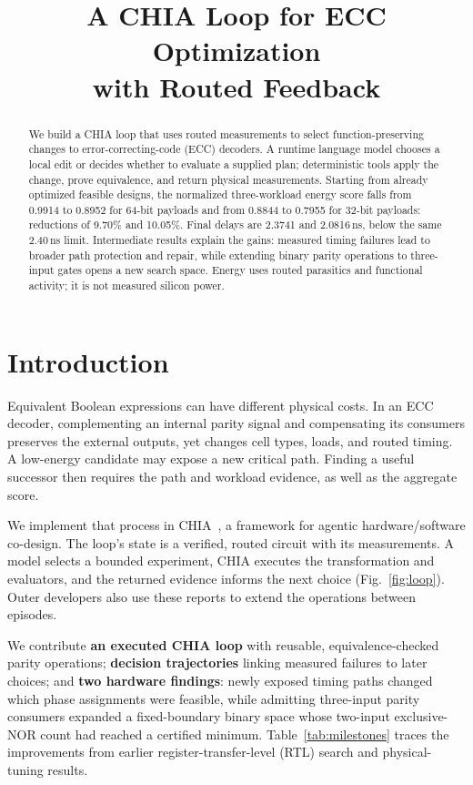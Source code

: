 \documentclass[conference,10pt]{IEEEtran}
\title{A CHIA Loop for ECC Optimization\\with Routed Feedback}
\author{\IEEEauthorblockN{Ssu-Rui Lee}\IEEEauthorblockA{RaydioTek, Taiwan\\\texttt{ssr.lee@raydiotek.tw}}}
\begin{document}
\maketitle
\raggedbottom
{}
\begin{abstract}
We build a CHIA loop that uses routed measurements to select function-preserving changes to error-correcting-code (ECC) decoders. A runtime language model chooses a local edit or decides whether to evaluate a supplied plan; deterministic tools apply the change, prove equivalence, and return physical measurements. Starting from already optimized feasible designs, the normalized three-workload energy score falls from 0.9914 to 0.8952 for 64-bit payloads and from 0.8844 to 0.7955 for 32-bit payloads: reductions of 9.70\% and 10.05\%. Final delays are 2.3741 and 2.0816\,ns, below the same 2.40\,ns limit. Intermediate results explain the gains: measured timing failures lead to broader path protection and repair, while extending binary parity operations to three-input gates opens a new search space. Energy uses routed parasitics and functional activity; it is not measured silicon power.
\end{abstract}

\section{Introduction}

Equivalent Boolean expressions can have different physical costs. In an ECC decoder, complementing an internal parity signal and compensating its consumers preserves the external outputs, yet changes cell types, loads, and routed timing. A low-energy candidate may expose a new critical path. Finding a useful successor then requires the path and workload evidence, as well as the aggregate score.

We implement that process in CHIA~\cite{chia}, a framework for agentic hardware/software co-design. The loop's state is a verified, routed circuit with its measurements. A model selects a bounded experiment, CHIA executes the transformation and evaluators, and the returned evidence informs the next choice (Fig.~\ref{fig:loop}). Outer developers also use these reports to extend the operations between episodes.

We contribute \textbf{an executed CHIA loop} with reusable, equivalence-checked parity operations; \textbf{decision trajectories} linking measured failures to later choices; and \textbf{two hardware findings}: newly exposed timing paths changed which phase assignments were feasible, while admitting three-input parity consumers expanded a fixed-boundary binary space whose two-input exclusive-NOR count had reached a certified minimum. Table~\ref{tab:milestones} traces the improvements from earlier register-transfer-level (RTL) search and physical-tuning results.
\end{document}
